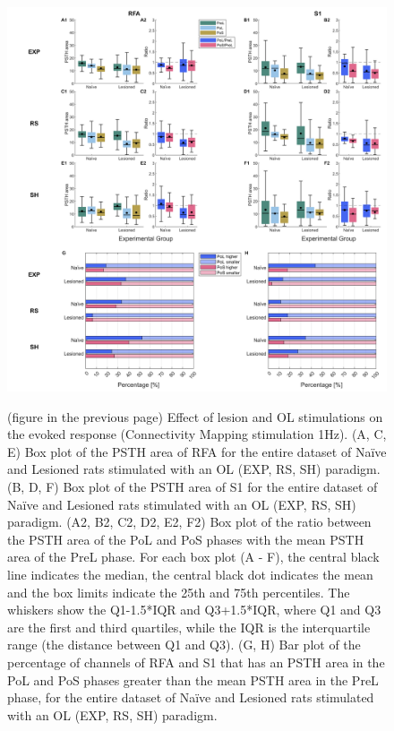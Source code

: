 \begin{figure}[htp]
    \begin{center}
    \includegraphics[width=\linewidth]{Figure/Ratio PSTH area separate/ratio all PSTH area 1Hz.jpg}
    \end{center}
\end{figure}
\begin{figure}[p!]
    \caption{(figure in the previous page) Effect of lesion and OL stimulations on the evoked response (Connectivity Mapping stimulation 1Hz). (A, C, E) Box plot of the PSTH area of RFA for the entire dataset of Naïve and Lesioned rats stimulated with an OL (EXP, RS, SH) paradigm. (B, D, F) Box plot of the PSTH area of S1 for the entire dataset of Naïve and Lesioned rats stimulated with an OL (EXP, RS, SH) paradigm. (A2, B2, C2, D2, E2, F2) Box plot of the ratio between the PSTH area of the PoL and PoS phases with the mean PSTH area of the PreL phase. For each box plot (A - F), the central black line indicates the median, the central black dot indicates the mean and the box limits indicate the 25th and 75th percentiles. The whiskers show the Q1-1.5*IQR and Q3+1.5*IQR, where Q1 and Q3 are the first and third quartiles, while the IQR is the interquartile range (the distance between Q1 and Q3). (G, H) Bar plot of the percentage of channels of RFA and S1 that has an PSTH area in the PoL and PoS phases greater than the mean PSTH area in the PreL phase, for the entire dataset of Naïve and Lesioned rats stimulated with an OL (EXP, RS, SH) paradigm.}
    \label{fig:ratio all PSTH area 1Hz}
\end{figure}

